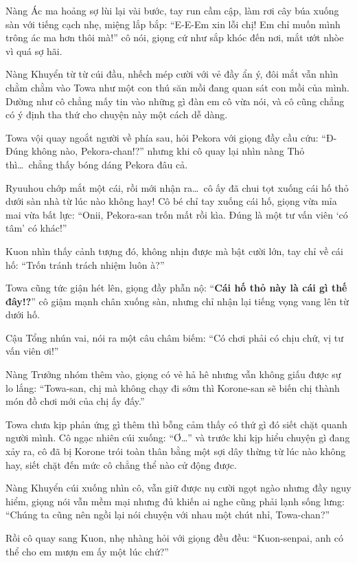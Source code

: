 \documentclass[../main.tex]{subfiles}
\begin{document}
Nàng Ác ma hoảng sợ lùi lại vài bước, tay run cầm cập, làm rơi cây búa xuống sàn với tiếng cạch nhẹ, miệng lắp bắp: ``E-E-Em xin lỗi chị! Em chỉ muốn mình trông ác ma hơn thôi mà!'' cô nói, giọng cứ như sắp khóc đến nơi, mắt ướt nhòe vì quá sợ hãi.

Nàng Khuyển từ từ cúi đầu, nhếch mép cười với vẻ đầy ẩn ý, đôi mắt vẫn nhìn chằm chằm vào Towa như một con thú săn mồi đang quan sát con mồi của mình. Dường như cô chẳng mấy tin vào những gì đàn em cô vừa nói, và cô cũng chẳng có ý định tha thứ cho chuyện này một cách dễ dàng.

Towa vội quay ngoắt người về phía sau, hỏi Pekora với giọng đầy cầu cứu: ``Đ-Đúng không nào, Pekora-chan!?'' nhưng khi cô quay lại nhìn nàng Thỏ thì\dots\ chẳng thấy bóng dáng Pekora đâu cả.

Ryuuhou chớp mắt một cái, rồi mới nhận ra\dots\ cô ấy đã chui tọt xuống cái hố thỏ dưới sàn nhà từ lúc nào không hay! Cô bé chỉ tay xuống cái hố, giọng vừa mỉa mai vừa bất lực: ``Onii, Pekora-san trốn mất rồi kìa. Đúng là một tư vấn viên `có tâm' có khác!''


Kuon nhìn thấy cảnh tượng đó, không nhịn được mà bật cười lớn, tay chỉ về cái hố: ``Trốn tránh trách nhiệm luôn à?''

Towa cũng tức giận hét lên, giọng đầy phẫn nộ: ``\textbf{Cái hố thỏ này là cái gì thế đây!?}'' cô giậm mạnh chân xuống sàn, nhưng chỉ nhận lại tiếng vọng vang lên từ dưới hố.

Cậu Tổng nhún vai, nói ra một câu châm biếm: ``Có chơi phải có chịu chứ, vị tư vấn viên ơi!''

Nàng Trưởng nhóm thêm vào, giọng có vẻ hả hê nhưng vẫn không giấu được sự lo lắng: ``Towa-san, chị mà không chạy đi sớm thì Korone-san sẽ biến chị thành món đồ chơi mới của chị ấy đấy.''

Towa chưa kịp phản ứng gì thêm thì bỗng cảm thấy có thứ gì đó siết chặt quanh người mình. Cô ngạc nhiên cúi xuống: ``Ơ\dots'' và trước khi kịp hiểu chuyện gì đang xảy ra, cô đã bị Korone trói toàn thân bằng một sợi dây thừng từ lúc nào không hay, siết chặt đến mức cô chẳng thể nào cử động được.

Nàng Khuyển cúi xuống nhìn cô, vẫn giữ được nụ cười ngọt ngào nhưng đầy nguy hiểm, giọng nói vẫn mềm mại nhưng đủ khiến ai nghe cũng phải lạnh sống lưng: ``Chúng ta cũng nên ngồi lại nói chuyện với nhau một chút nhỉ, Towa-chan?''

Rồi cô quay sang Kuon, nhẹ nhàng hỏi với giọng đều đều: ``Kuon-senpai, anh có thể cho em mượn em ấy một lúc chứ?''
\end{document}
